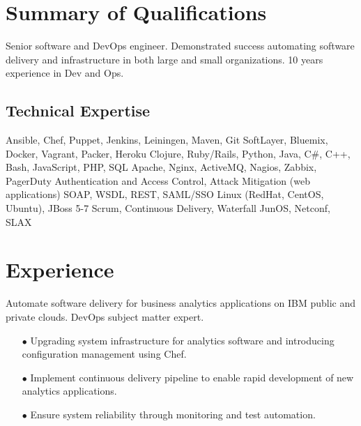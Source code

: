 \documentclass[12pt,letter,roman]{moderncv}
\begin{document}
\makecvtitle

\section{Summary of Qualifications}

Senior software and DevOps engineer. Demonstrated success automating software
delivery and infrastructure in both large and small organizations. 10 years
experience in Dev and Ops.

\subsection{Technical Expertise}

 { Ansible, Chef, Puppet, Jenkins, Leiningen, Maven, Git }
 { SoftLayer, Bluemix, Docker, Vagrant, Packer, Heroku }
 { Clojure, Ruby/Rails, Python, Java, C\#, C++, Bash, JavaScript, PHP, SQL }
 { Apache, Nginx, ActiveMQ, Nagios, Zabbix, PagerDuty }
 { Authentication and Access Control, Attack Mitigation (web applications) }
 { SOAP, WSDL, REST, SAML/SSO }
 { Linux (RedHat, CentOS, Ubuntu), JBoss 5-7 }
 { Scrum, Continuous Delivery, Waterfall }
 { JunOS, Netconf, SLAX }

\section{Experience}


Automate software delivery for business analytics applications on IBM public
and private clouds. DevOps subject matter expert.

\begin{itemize}

    \item[$\bullet$] Upgrading system infrastructure for analytics software and introducing configuration management using Chef.

    \item[$\bullet$] Implement continuous delivery pipeline to enable rapid development of new analytics applications.

    \item[$\bullet$] Ensure system reliability through monitoring and test automation.

\end{itemize}
\end{document}
